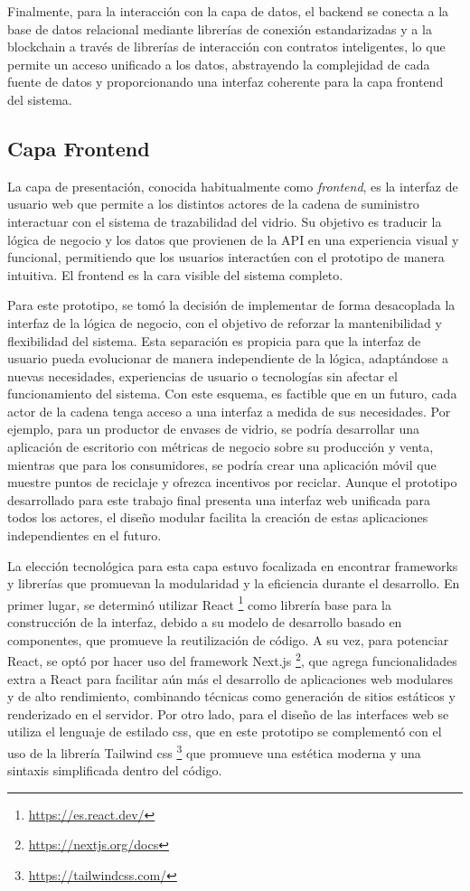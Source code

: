 Finalmente, para la interacción con la capa de datos, el backend se conecta a la base de datos relacional mediante librerías de conexión estandarizadas y a la blockchain a través de librerías de interacción con contratos inteligentes, lo que permite un acceso unificado a los datos, abstrayendo la complejidad de cada fuente de datos y proporcionando una interfaz coherente para la capa frontend del sistema.

\subsection{Capa Frontend}

La capa de presentación, conocida habitualmente como \textit{frontend}, es la interfaz de usuario web que permite a los distintos actores de la cadena de suministro interactuar con el sistema de trazabilidad del vidrio. Su objetivo es traducir la lógica de negocio y los datos que provienen de la API en una experiencia visual y funcional, permitiendo que los usuarios interactúen con el prototipo de manera intuitiva. El frontend es la cara visible del sistema completo.

Para este prototipo, se tomó la decisión de implementar de forma desacoplada la interfaz de la lógica de negocio, con el objetivo de reforzar la mantenibilidad y flexibilidad del sistema. Esta separación es propicia para que la interfaz de usuario pueda evolucionar de manera independiente de la lógica, adaptándose a nuevas necesidades, experiencias de usuario o tecnologías sin afectar el funcionamiento del sistema. Con este esquema, es factible que en un futuro, cada actor de la cadena tenga acceso a una interfaz a medida de sus necesidades. Por ejemplo, para un productor de envases de vidrio, se podría desarrollar una aplicación de escritorio con métricas de negocio sobre su producción y venta, mientras que para los consumidores, se podría crear una aplicación móvil que muestre puntos de reciclaje y ofrezca incentivos por reciclar. Aunque el prototipo desarrollado para este trabajo final presenta una interfaz web unificada para todos los actores, el diseño modular facilita la creación de estas aplicaciones independientes en el futuro.

La elección tecnológica para esta capa estuvo focalizada en encontrar frameworks y librerías que promuevan la modularidad y la eficiencia durante el desarrollo. En primer lugar, se determinó utilizar React \footnote{\url{https://es.react.dev/}} como librería base para la construcción de la interfaz, debido a su modelo de desarrollo basado en componentes, que promueve la reutilización de código. A su vez, para potenciar React, se optó por hacer uso del framework Next.js \footnote{\url{https://nextjs.org/docs}}, que agrega funcionalidades extra a React para facilitar aún más el desarrollo de aplicaciones web modulares y de alto rendimiento, combinando técnicas como generación de sitios estáticos y renderizado en el servidor. Por otro lado, para el diseño de las interfaces web se utiliza el lenguaje de estilado \acrshort{css}, que en este prototipo se complementó con el uso de la librería Tailwind \acrshort{css} \footnote{\url{https://tailwindcss.com/}} que promueve una estética moderna y una sintaxis simplificada dentro del código.

